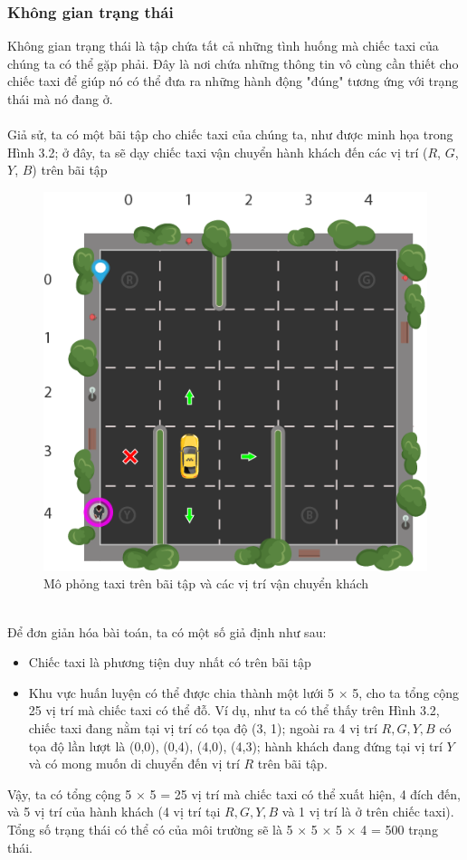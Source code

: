 \documentclass[12pt,a4paper]{report}
\begin{document}
\subsubsection{Không gian trạng thái}
Không gian trạng thái là tập chứa tất cả những tình huống mà chiếc taxi của chúng ta có
thể gặp phải. Đây là nơi chứa những thông tin vô cùng cần thiết cho chiếc taxi để giúp nó có
thể đưa ra những hành động "đúng" tương ứng với trạng thái mà nó đang ở.\\\\
Giả sử, ta có một bãi tập cho chiếc taxi của chúng ta, như được minh họa trong Hình 3.2;
ở đây, ta sẽ dạy chiếc taxi vận chuyển hành khách đến các vị trí ($R$, $G$, $Y$, $B$) trên bãi tập
\begin{figure}
	\centering
	\includegraphics[scale=.5]{7}
	\caption{Mô phỏng taxi trên bãi tập và các vị trí vận chuyển khách}
\end{figure}\\
Để đơn giản hóa bài toán, ta có một số giả định như sau:
\begin{itemize}
	\item Chiếc taxi là phương tiện duy nhất có trên bãi tập
	\item  Khu vực huấn luyện có thể được chia thành một lưới 5 $\times$ 5, cho ta tổng cộng 25 vị trí
	mà chiếc taxi có thể đỗ. Ví dụ, như ta có thể thấy trên Hình 3.2, chiếc taxi đang nằm tại
	vị trí có tọa độ (3, 1); ngoài ra 4 vị trí $R, G, Y, B$ có tọa độ lần lượt là (0,0), (0,4), (4,0),
	(4,3); hành khách đang đứng tại vị trí $Y$ và có mong muốn di chuyển đến
	vị trí $R$ trên bãi tập.
\end{itemize}
Vậy, ta có tổng cộng 5 $\times$ 5 = 25 vị trí mà chiếc taxi có thể xuất hiện, 4 đích đến, và 5 vị
trí của hành khách (4 vị trí tại $R, G, Y, B$ và 1 vị trí là ở trên chiếc taxi). Tổng số trạng thái
có thể có của môi trường sẽ là 5 $\times$ 5 $\times$ 5 $\times$ 4 = 500 trạng thái.
\end{document}
